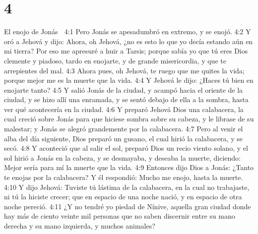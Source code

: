 \chapter{4}

El enojo de Jonás  

4:1 Pero Jonás se apesadumbró en extremo, y se enojó.  
4:2 Y oró a Jehová y dijo: Ahora, oh Jehová, ¿no es esto lo que yo decía estando aún en mi tierra? Por eso me apresuré a huir a Tarsis; porque sabía yo que tú eres Dios clemente y piadoso, tardo en enojarte, y de grande misericordia, y que te arrepientes del mal.  
4:3 Ahora pues, oh Jehová, te ruego que me quites la vida; porque mejor me es la muerte que la vida.  
4:4 Y Jehová le dijo: ¿Haces tú bien en enojarte tanto?  
4:5 Y salió Jonás de la ciudad, y acampó hacia el oriente de la ciudad, y se hizo allí una enramada, y se sentó debajo de ella a la sombra, hasta ver qué acontecería en la ciudad.  
4:6 Y preparó Jehová Dios una calabacera, la cual creció sobre Jonás para que hiciese sombra sobre su cabeza, y le librase de su malestar; y Jonás se alegró grandemente por la calabacera.  
4:7 Pero al venir el alba del día siguiente, Dios preparó un gusano, el cual hirió la calabacera, y se secó.  
4:8 Y aconteció que al salir el sol, preparó Dios un recio viento solano, y el sol hirió a Jonás en la cabeza, y se desmayaba, y deseaba la muerte, diciendo: Mejor sería para mí la muerte que la vida.  
4:9 Entonces dijo Dios a Jonás: ¿Tanto te enojas por la calabacera? Y él respondió: Mucho me enojo, hasta la muerte.  
4:10 Y dijo Jehová: Tuviste tú lástima de la calabacera, en la cual no trabajaste, ni tú la hiciste crecer; que en espacio de una noche nació, y en espacio de otra noche pereció.  
4:11 ¿Y no tendré yo piedad de Nínive, aquella gran ciudad donde hay más de ciento veinte mil personas que no saben discernir entre su mano derecha y su mano izquierda, y muchos animales?

